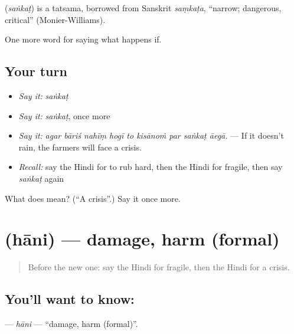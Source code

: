\begin{cousinweb}
\textbf{} (\emph{saṅkaṭ}) is a tatsama, borrowed from Sanskrit \emph{saṃkaṭa}, \textquotedblleft{}narrow; dangerous, critical\textquotedblright{} (Monier-Williams).
\end{cousinweb}

\begin{grammarlens}[title={What you've built}]
One more word for saying what happens if.
\end{grammarlens}

\subsection*{Your turn}
\begin{itemize}
\raggedright
  \item \emph{Say it:} \emph{saṅkaṭ}
  \item \emph{Say it:} \emph{saṅkaṭ}, once more
  \item \emph{Say it:} \emph{agar bāriś nahīṃ hogī to kisānoṁ par saṅkaṭ āegā.} — If it doesn't rain, the farmers will face a crisis.
  \item \emph{Recall:} say the Hindi for to rub hard, then the Hindi for fragile, then say \emph{saṅkaṭ} again
\end{itemize}

\begin{tcolorbox}[breakable,colback=teal!4,colframe=teal!35!black,title={Before you move on}]
What does  mean? (\textquotedblleft{}A crisis\textquotedblright{}.) Say it once more.
\end{tcolorbox}
\section[\texorpdfstring{\hi{हानि} (hāni)}{हानि (hāni)}]{ (hāni) — damage, harm (formal)}

\label{lesson:HI-C383-hani}



\begin{quote}
Before the new one: say the Hindi for fragile, then the Hindi for a crisis.
\end{quote}

\subsection*{You'll want to know: }
\textbf{} — \emph{hāni} — \textquotedblleft{}damage, harm (formal)\textquotedblright{}.

